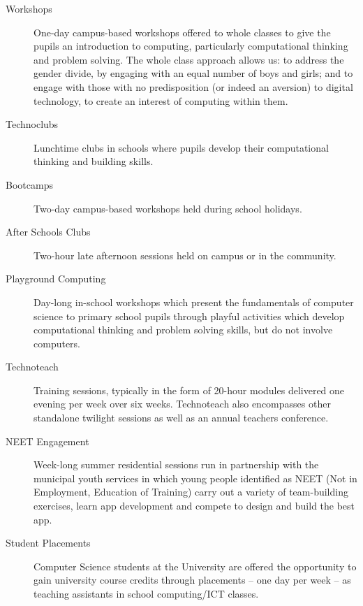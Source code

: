 \documentclass{sig-alternate}
\begin{document}
\begin{description}
\item[Workshops]
One-day campus-based workshops offered to whole classes
to give the pupils an introduction to computing,
particularly computational thinking and problem solving.
The whole class approach allows us: to address the gender divide,
by engaging with an equal number of boys and girls;
and to engage with those with no predisposition (or indeed an aversion)
to digital technology, to create an interest of computing within them.
\item[Technoclubs]
Lunchtime clubs in schools where pupils develop
their computational thinking and building skills.
\item[Bootcamps]
Two-day campus-based workshops held during school holidays.
\item[After Schools Clubs]
Two-hour late afternoon sessions held on campus or in the community.
\item[Playground Computing]
Day-long in-school workshops which present
the fundamentals of computer science to primary school pupils
through playful activities which develop computational thinking
and problem solving skills, but do not involve computers.
\item[Technoteach]
Training sessions, typically in the form of 20-hour modules
delivered one evening per week over six weeks.
Technoteach also encompasses other standalone twilight sessions
as well as an annual teachers conference.
\item[NEET Engagement]
Week-long summer residential sessions run in partnership with
the municipal youth services in which young people identified
as NEET (Not in Employment, Education of Training)
carry out a variety of team-building exercises,
learn app development and compete to design and build the best app.
\item[Student Placements]
Computer Science students at the University are offered
the opportunity to gain university course credits through
placements -- one day per week -- as teaching assistants
in school computing/ICT classes.
\end{description}
\end{document}

